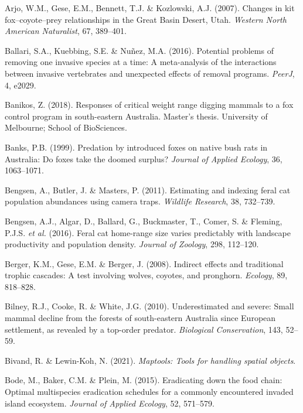 \documentclass[11pt,a4paper,titlepage,twoside,openright]{style/unimelbthesis}
\begin{document}
\begin{mainmatter}
\leavevmode\hypertarget{ref-arjo2007changes}{}%
Arjo, W.M., Gese, E.M., Bennett, T.J. \& Kozlowski, A.J. (2007). Changes in kit fox--coyote--prey relationships in the Great Basin Desert, Utah. \emph{Western North American Naturalist}, 67, 389--401.

\leavevmode\hypertarget{ref-ballari2016potential}{}%
Ballari, S.A., Kuebbing, S.E. \& Nuñez, M.A. (2016). Potential problems of removing one invasive species at a time: A meta-analysis of the interactions between invasive vertebrates and unexpected effects of removal programs. \emph{PeerJ}, 4, e2029.

\leavevmode\hypertarget{ref-banikos2018responses}{}%
Banikos, Z. (2018). Responses of critical weight range digging mammals to a fox control program in south-eastern Australia. Master's thesis. University of Melbourne; School of BioSciences.

\leavevmode\hypertarget{ref-banks1999predation}{}%
Banks, P.B. (1999). Predation by introduced foxes on native bush rats in Australia: Do foxes take the doomed surplus? \emph{Journal of Applied Ecology}, 36, 1063--1071.

\leavevmode\hypertarget{ref-bengsen2011estimating}{}%
Bengsen, A., Butler, J. \& Masters, P. (2011). Estimating and indexing feral cat population abundances using camera traps. \emph{Wildlife Research}, 38, 732--739.

\leavevmode\hypertarget{ref-bengsen2016feral}{}%
Bengsen, A.J., Algar, D., Ballard, G., Buckmaster, T., Comer, S. \& Fleming, P.J.S. \emph{et al.} (2016). Feral cat home-range size varies predictably with landscape productivity and population density. \emph{Journal of Zoology}, 298, 112--120.

\leavevmode\hypertarget{ref-berger2008indirect}{}%
Berger, K.M., Gese, E.M. \& Berger, J. (2008). Indirect effects and traditional trophic cascades: A test involving wolves, coyotes, and pronghorn. \emph{Ecology}, 89, 818--828.

\leavevmode\hypertarget{ref-bilney2010underestimated}{}%
Bilney, R.J., Cooke, R. \& White, J.G. (2010). Underestimated and severe: Small mammal decline from the forests of south-eastern Australia since European settlement, as revealed by a top-order predator. \emph{Biological Conservation}, 143, 52--59.

\leavevmode\hypertarget{ref-maptools}{}%
Bivand, R. \& Lewin-Koh, N. (2021). \emph{Maptools: Tools for handling spatial objects}.

\leavevmode\hypertarget{ref-bode2015eradicating}{}%
Bode, M., Baker, C.M. \& Plein, M. (2015). Eradicating down the food chain: Optimal multispecies eradication schedules for a commonly encountered invaded island ecosystem. \emph{Journal of Applied Ecology}, 52, 571--579.


\end{mainmatter}
\end{document}
